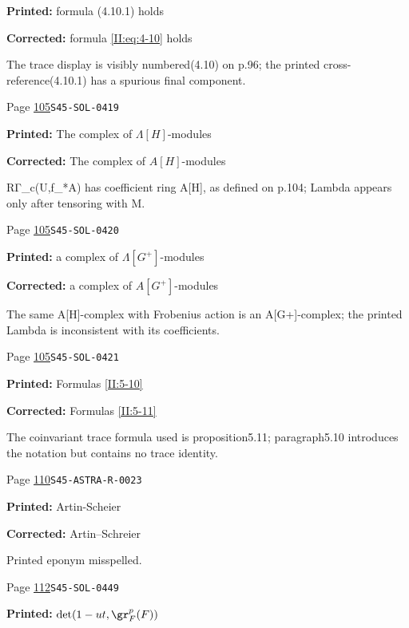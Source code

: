 \begin{description}
\par\noindent\textbf{Printed:} formula (4.10.1) holds
\par\noindent\textbf{Corrected:} formula \eqref{II:eq:4-10} holds
\par\noindent The trace display is visibly numbered(4.10) on p.96; the printed cross-reference(4.10.1) has a spurious final component.
\smallskip
\item[\hypertarget{apparatus:EN-0042}{42}] Page \hyperlink{printpage:en:105}{105}\quad\texttt{S45-SOL-0419}
\par\noindent\textbf{Printed:} The complex of $\Lambda[H]$-modules
\par\noindent\textbf{Corrected:} The complex of $A[H]$-modules
\par\noindent RΓ\_c(U,f\_*A) has coefficient ring A[H], as defined on p.104; Lambda appears only after tensoring with M.
\smallskip
\item[\hypertarget{apparatus:EN-0043}{43}] Page \hyperlink{printpage:en:105}{105}\quad\texttt{S45-SOL-0420}
\par\noindent\textbf{Printed:} a complex of $\Lambda[G^+]$-modules
\par\noindent\textbf{Corrected:} a complex of $A[G^+]$-modules
\par\noindent The same A[H]-complex with Frobenius action is an A[G+]-complex; the printed Lambda is inconsistent with its coefficients.
\smallskip
\item[\hypertarget{apparatus:EN-0044}{44}] Page \hyperlink{printpage:en:105}{105}\quad\texttt{S45-SOL-0421}
\par\noindent\textbf{Printed:} Formulas \ref{II:5-10}
\par\noindent\textbf{Corrected:} Formulas \ref{II:5-11}
\par\noindent The coinvariant trace formula used is proposition5.11; paragraph5.10 introduces the notation but contains no trace identity.
\smallskip
\item[\hypertarget{apparatus:EN-0045}{45}] Page \hyperlink{printpage:en:110}{110}\quad\texttt{S45-ASTRA-R-0023}
\par\noindent\textbf{Printed:} Artin-Scheier
\par\noindent\textbf{Corrected:} Artin--Schreier
\par\noindent Printed eponym misspelled.
\smallskip
\item[\hypertarget{apparatus:EN-0046}{46}] Page \hyperlink{printpage:en:112}{112}\quad\texttt{S45-SOL-0449}
\par\noindent\textbf{Printed:} \(\det(1-u t,\gr_F^p(F))\)

\end{description}
